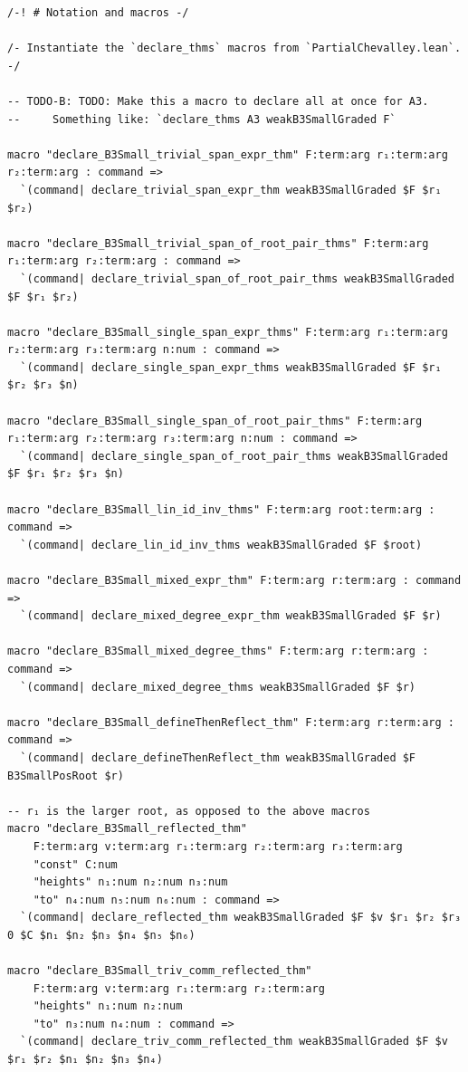 \documentclass[10pt,a4paper]{article}
\begin{document}
\begin{Verbatim}
/-! # Notation and macros -/

/- Instantiate the `declare_thms` macros from `PartialChevalley.lean`. -/

-- TODO-B: TODO: Make this a macro to declare all at once for A3.
--     Something like: `declare_thms A3 weakB3SmallGraded F`

macro "declare_B3Small_trivial_span_expr_thm" F:term:arg r₁:term:arg r₂:term:arg : command =>
  `(command| declare_trivial_span_expr_thm weakB3SmallGraded $F $r₁ $r₂)

macro "declare_B3Small_trivial_span_of_root_pair_thms" F:term:arg r₁:term:arg r₂:term:arg : command =>
  `(command| declare_trivial_span_of_root_pair_thms weakB3SmallGraded $F $r₁ $r₂)

macro "declare_B3Small_single_span_expr_thms" F:term:arg r₁:term:arg r₂:term:arg r₃:term:arg n:num : command =>
  `(command| declare_single_span_expr_thms weakB3SmallGraded $F $r₁ $r₂ $r₃ $n)

macro "declare_B3Small_single_span_of_root_pair_thms" F:term:arg r₁:term:arg r₂:term:arg r₃:term:arg n:num : command =>
  `(command| declare_single_span_of_root_pair_thms weakB3SmallGraded $F $r₁ $r₂ $r₃ $n)

macro "declare_B3Small_lin_id_inv_thms" F:term:arg root:term:arg : command =>
  `(command| declare_lin_id_inv_thms weakB3SmallGraded $F $root)

macro "declare_B3Small_mixed_expr_thm" F:term:arg r:term:arg : command =>
  `(command| declare_mixed_degree_expr_thm weakB3SmallGraded $F $r)

macro "declare_B3Small_mixed_degree_thms" F:term:arg r:term:arg : command =>
  `(command| declare_mixed_degree_thms weakB3SmallGraded $F $r)

macro "declare_B3Small_defineThenReflect_thm" F:term:arg r:term:arg : command =>
  `(command| declare_defineThenReflect_thm weakB3SmallGraded $F B3SmallPosRoot $r)

-- r₁ is the larger root, as opposed to the above macros
macro "declare_B3Small_reflected_thm"
    F:term:arg v:term:arg r₁:term:arg r₂:term:arg r₃:term:arg
    "const" C:num
    "heights" n₁:num n₂:num n₃:num
    "to" n₄:num n₅:num n₆:num : command =>
  `(command| declare_reflected_thm weakB3SmallGraded $F $v $r₁ $r₂ $r₃ 0 $C $n₁ $n₂ $n₃ $n₄ $n₅ $n₆)

macro "declare_B3Small_triv_comm_reflected_thm"
    F:term:arg v:term:arg r₁:term:arg r₂:term:arg
    "heights" n₁:num n₂:num
    "to" n₃:num n₄:num : command =>
  `(command| declare_triv_comm_reflected_thm weakB3SmallGraded $F $v $r₁ $r₂ $n₁ $n₂ $n₃ $n₄)


\end{Verbatim}
\end{document}
